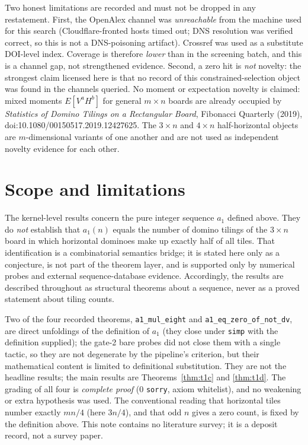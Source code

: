 \documentclass[11pt]{article}
\begin{document}
Two honest limitations are recorded and must not be dropped in any restatement.
First, the OpenAlex channel was \emph{unreachable} from the machine used for this search
(Cloudflare-fronted hosts timed out; DNS resolution was verified correct, so this is not a
DNS-poisoning artifact). Crossref was used as a substitute DOI-level index. Coverage is
therefore \emph{lower} than in the screening batch, and this is a channel gap, not
strengthened evidence.
Second, a zero hit is \emph{not} novelty: the strongest claim licensed here is that no
record of this constrained-selection object was found in the channels queried.
No moment or expectation novelty is claimed: mixed moments $E[V^a H^b]$ for general $m\times n$
boards are already occupied by \emph{Statistics of Domino Tilings on a Rectangular Board},
Fibonacci Quarterly (2019), doi:10.1080/00150517.2019.12427625.
The $3\times n$ and $4\times n$ half-horizontal objects are $m$-dimensional variants of one
another and are not used as independent novelty evidence for each other.

\section{Scope and limitations}
The kernel-level results concern the pure integer sequence $a_1$ defined above. They do
\emph{not} establish that $a_1(n)$ equals the number of domino tilings of the $3\times n$
board in which horizontal dominoes make up exactly half of all tiles. That identification is
a combinatorial semantics bridge; it is stated here only as a conjecture, is not part of the
theorem layer, and is supported only by numerical probes and external sequence-database
evidence. Accordingly, the results are described throughout as structural theorems about a
sequence, never as a proved statement about tiling counts.

Two of the four recorded theorems, \texttt{a1\_mul\_eight} and
\texttt{a1\_eq\_zero\_of\_not\_dv}, are direct unfoldings of the definition of $a_1$
(they close under \texttt{simp} with the definition supplied); the gate-2 bare probes did not
close them with a single tactic, so they are not degenerate by the pipeline's criterion, but
their mathematical content is limited to definitional substitution. They are not the headline
results; the main results are Theorems~\ref{thm:t1c} and \ref{thm:t1d}. The grading of all four
is \emph{complete proof} (0 \texttt{sorry}, axiom whitelist), and no weakening or extra
hypothesis was used. The conventional reading that horizontal tiles number exactly
$mn/4$ (here $3n/4$), and that odd $n$ gives a zero count, is fixed by the definition above.
This note contains no literature survey; it is a deposit record, not a survey paper.
\end{document}
